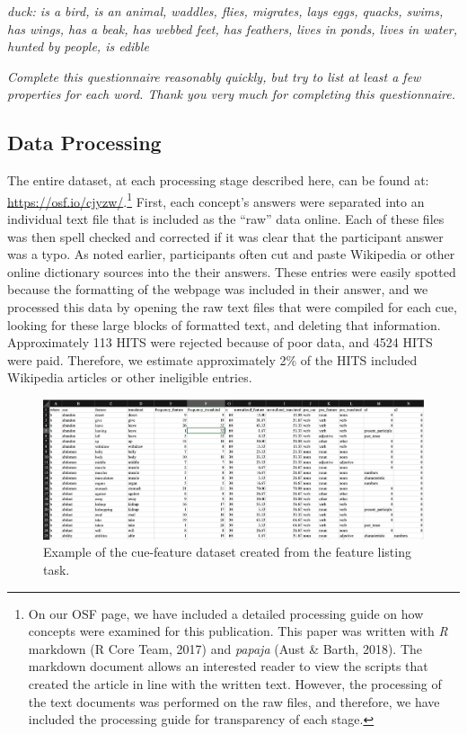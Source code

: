 \documentclass[english,,man]{apa6}
\let\rmarkdownfootnote\footnote%
\def\footnote{\protect\rmarkdownfootnote}
\begin{document}
\emph{duck: is a bird, is an animal, waddles, flies, migrates, lays eggs, quacks, swims, has wings, has a beak, has webbed feet, has feathers, lives in ponds, lives in water, hunted by people, is edible}

\emph{Complete this questionnaire reasonably quickly, but try to list at least a few properties for each word. Thank you very much for completing this questionnaire.}

\hypertarget{data-processing}{%
\subsection{Data Processing}\label{data-processing}}

The entire dataset, at each processing stage described here, can be found at: \url{https://osf.io/cjyzw/}.\footnote{On our OSF page, we have included a detailed processing guide on how concepts were examined for this publication. This paper was written with \emph{R} markdown (R Core Team, 2017) and \emph{papaja} (Aust \& Barth, 2018). The markdown document allows an interested reader to view the scripts that created the article in line with the written text. However, the processing of the text documents was performed on the raw files, and therefore, we have included the processing guide for transparency of each stage.} First, each concept's answers were separated into an individual text file that is included as the \enquote{raw} data online. Each of these files was then spell checked and corrected if it was clear that the participant answer was a typo. As noted earlier, participants often cut and paste Wikipedia or other online dictionary sources into the their answers. These entries were easily spotted because the formatting of the webpage was included in their answer, and we processed this data by opening the raw text files that were compiled for each cue, looking for these large blocks of formatted text, and deleting that information. Approximately 113 HITS were rejected because of poor data, and 4524 HITS were paid. Therefore, we estimate approximately 2\% of the HITS included Wikipedia articles or other ineligible entries.

\begin{figure}
\includegraphics[width=1\linewidth]{featuredataset} \caption{Example of the cue-feature dataset created from the feature listing task.}\label{fig:featuredata}
\end{figure}
\end{document}
